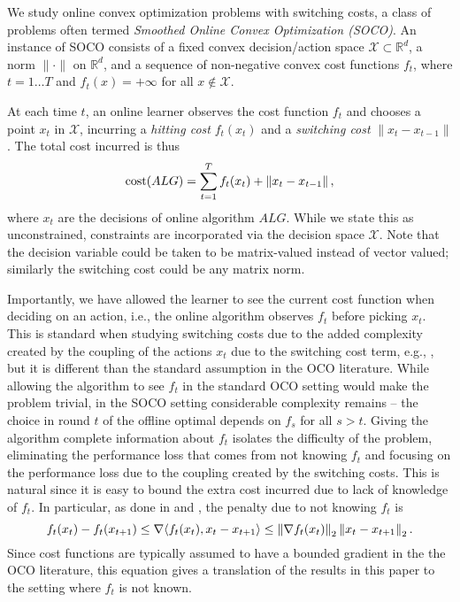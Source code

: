 
We study online convex optimization problems with switching costs, a class of problems often termed \emph{Smoothed Online Convex Optimization (SOCO)}. An instance of SOCO consists of a fixed convex decision/action space $\mathcal{X} \subset \mathbb{R}^d$, a norm $\|\cdot \|$ on $\mathbb{R}^d$, and a sequence of non-negative convex cost functions $f_t$, where $t = 1 \ldots T$ and $f_t(x) = +\infty$ for all $x \notin \mathcal{X}$. 

At each time $t$, an online learner observes the cost function $f_t$ and chooses a point $x_t$ in $\mathcal{X}$, incurring a \emph{hitting cost} $f_t(x_t)$ and a \emph{switching cost} $\|x_t - x_{t-1}\|$. The total cost incurred is thus 
\begin{equation}
\mathrm{cost}(ALG)=\sum_{t=1}^T f_t(x_t) + \left\lVert x_t - x_{t-1} \right\rVert,
\end{equation}
where $x_t$ are the decisions of online algorithm $ALG$.  While we state this as unconstrained, constraints are incorporated via the decision space $\mathcal{X}$. Note that the decision variable could be taken to be matrix-valued instead of vector valued; similarly the switching cost could be any matrix norm.

Importantly, we have allowed the learner to see the current cost function when deciding on an action, i.e., the online algorithm observes $f_t$ before picking $x_t$.  This is standard when studying switching costs due to the added complexity created by the coupling of the actions $x_t$ due to the switching cost term, e.g., \cite{andrew2013,bansal2015}, but it is different than the standard assumption in the OCO literature. While allowing the algorithm to see $f_t$ in the standard OCO setting would make the problem trivial, in the SOCO setting considerable complexity remains -- the choice in round $t$ of the offline optimal depends on $f_s$ for all $s>t$.  Giving the algorithm complete information about $f_t$ isolates the difficulty of the problem, eliminating the performance loss that comes from not knowing $f_t$ and focusing on the performance loss due to the coupling created by the switching costs. This is natural since it is easy to bound the extra cost incurred due to lack of knowledge of $f_t$.  In particular, as done in \cite{Blum2000} and \cite{buchbinder2012unified}, the penalty due to not knowing $f_t$ is 
$$ f_t(x_t) - f_{t}(x_{t+1}) \leq \nabla \langle f_t(x_t), x_t - x_{t+1}\rangle \leq \left\lVert \nabla f_t(x_t) \right\rVert_2 \left\lVert x_t - x_{t+1} \right\rVert_2.$$
Since cost functions are typically assumed to have a bounded gradient in the the OCO literature, this equation gives a translation of the results in this paper to the setting where $f_t$ is not known.  

